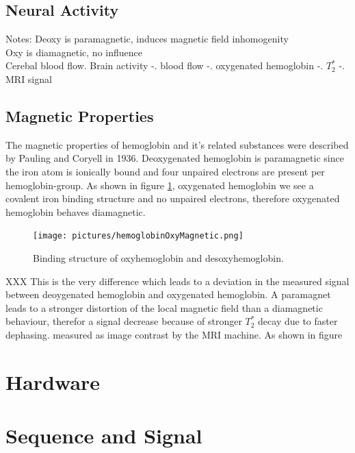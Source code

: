 \documentclass[a4paper]{scrartcl}
\begin{document}
\subsection{Neural Activity}


Notes:
Deoxy is paramagnetic, induces magnetic field inhomogenity \\
Oxy is diamagnetic, no influence \\
Cerebal blood flow. Brain activity -. blood flow -. oxygenated hemoglobin -. $T_2^*$ -. MRI signal

\subsection{Magnetic Properties}
\label{sub:magneticProperties}
The magnetic properties of hemoglobin and it's related substances were described by Pauling and Coryell in 1936.\cite{pauling}
Deoxygenated hemoglobin is paramagnetic since the iron atom is ionically bound and four unpaired electrons are present per hemoglobin-group. 
As shown in figure \ref{fig:bindingHb}, oxygenated hemoglobin we see a covalent iron binding structure and no unpaired electrons, therefore oxygenated hemoglobin behaves diamagnetic.\cite{Zborowski}
\begin{figure}[hb]
  \centering
  \texttt{[image: pictures/hemoglobinOxyMagnetic.png]}
  \caption{Binding structure of oxyhemoglobin and desoxyhemoglobin.\cite[2]{Bren}}
  \label{fig:bindingHb}
\end{figure}
XXX
This is the very difference which leads to a deviation in the measured signal between deoygenated hemoglobin and oxygenated hemoglobin.
A paramagnet leads to a stronger distortion of the local magnetic field than a diamagnetic behaviour, therefor a signal decrease because of stronger $T_2^*$ decay due to faster dephasing.
measured as image contrast by the MRI machine. As shown in figure  

\section{Hardware}
\label{sec:hardware}

\section{Sequence and Signal}
\label{sec:sequenceSignal}
\end{document}
